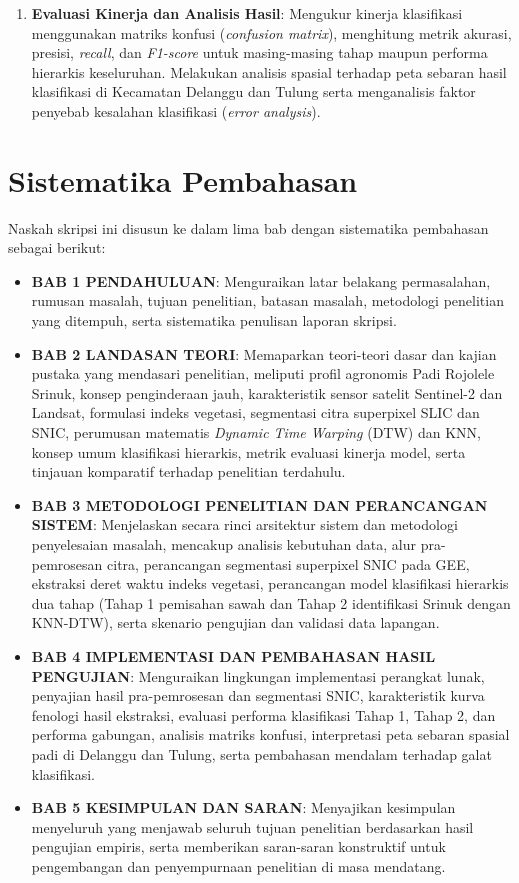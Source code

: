 \begin{enumerate}
    \item \textbf{Evaluasi Kinerja dan Analisis Hasil}: Mengukur kinerja klasifikasi menggunakan matriks konfusi (\textit{confusion matrix}), menghitung metrik akurasi, presisi, \textit{recall}, dan \textit{F1-score} untuk masing-masing tahap maupun performa hierarkis keseluruhan. Melakukan analisis spasial terhadap peta sebaran hasil klasifikasi di Kecamatan Delanggu dan Tulung serta menganalisis faktor penyebab kesalahan klasifikasi (\textit{error analysis}).
\end{enumerate}

\section{Sistematika Pembahasan}
\label{sec:sistematika}

Naskah skripsi ini disusun ke dalam lima bab dengan sistematika pembahasan sebagai berikut:

\begin{itemize}
    \item \textbf{BAB 1 PENDAHULUAN}: Menguraikan latar belakang permasalahan, rumusan masalah, tujuan penelitian, batasan masalah, metodologi penelitian yang ditempuh, serta sistematika penulisan laporan skripsi.
    
    \item \textbf{BAB 2 LANDASAN TEORI}: Memaparkan teori-teori dasar dan kajian pustaka yang mendasari penelitian, meliputi profil agronomis Padi Rojolele Srinuk, konsep penginderaan jauh, karakteristik sensor satelit Sentinel-2 dan Landsat, formulasi indeks vegetasi, segmentasi citra superpixel SLIC dan SNIC, perumusan matematis \textit{Dynamic Time Warping} (DTW) dan KNN, konsep umum klasifikasi hierarkis, metrik evaluasi kinerja model, serta tinjauan komparatif terhadap penelitian terdahulu.
    
    \item \textbf{BAB 3 METODOLOGI PENELITIAN DAN PERANCANGAN SISTEM}: Menjelaskan secara rinci arsitektur sistem dan metodologi penyelesaian masalah, mencakup analisis kebutuhan data, alur pra-pemrosesan citra, perancangan segmentasi superpixel SNIC pada GEE, ekstraksi deret waktu indeks vegetasi, perancangan model klasifikasi hierarkis dua tahap (Tahap 1 pemisahan sawah dan Tahap 2 identifikasi Srinuk dengan KNN-DTW), serta skenario pengujian dan validasi data lapangan.
    
    \item \textbf{BAB 4 IMPLEMENTASI DAN PEMBAHASAN HASIL PENGUJIAN}: Menguraikan lingkungan implementasi perangkat lunak, penyajian hasil pra-pemrosesan dan segmentasi SNIC, karakteristik kurva fenologi hasil ekstraksi, evaluasi performa klasifikasi Tahap 1, Tahap 2, dan performa gabungan, analisis matriks konfusi, interpretasi peta sebaran spasial padi di Delanggu dan Tulung, serta pembahasan mendalam terhadap galat klasifikasi.
    
    \item \textbf{BAB 5 KESIMPULAN DAN SARAN}: Menyajikan kesimpulan menyeluruh yang menjawab seluruh tujuan penelitian berdasarkan hasil pengujian empiris, serta memberikan saran-saran konstruktif untuk pengembangan dan penyempurnaan penelitian di masa mendatang.
\end{itemize}